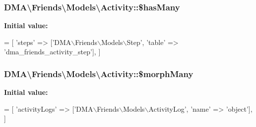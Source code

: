 \subsubsection[{\$has\+Many}]{\setlength{\rightskip}{0pt plus 5cm}D\+M\+A\textbackslash{}\+Friends\textbackslash{}\+Models\textbackslash{}\+Activity\+::\$has\+Many}\label{classDMA_1_1Friends_1_1Models_1_1Activity_a8b255e9889df95f8c702b72ed49ace25}
{\bfseries Initial value\+:}
\begin{DoxyCode}
= [
        \textcolor{stringliteral}{'steps'} => [\textcolor{stringliteral}{'DMA\(\backslash\)Friends\(\backslash\)Models\(\backslash\)Step'}, \textcolor{stringliteral}{'table'} => \textcolor{stringliteral}{'dma\_friends\_activity\_step'}],
    ]
\end{DoxyCode}
\hypertarget{classDMA_1_1Friends_1_1Models_1_1Activity_a192fdaacf609961b7a436d2b967dfd60}{}
\subsubsection[{\$morph\+Many}]{\setlength{\rightskip}{0pt plus 5cm}D\+M\+A\textbackslash{}\+Friends\textbackslash{}\+Models\textbackslash{}\+Activity\+::\$morph\+Many}\label{classDMA_1_1Friends_1_1Models_1_1Activity_a192fdaacf609961b7a436d2b967dfd60}
{\bfseries Initial value\+:}
\begin{DoxyCode}
= [ 
        \textcolor{stringliteral}{'activityLogs'}  => [\textcolor{stringliteral}{'DMA\(\backslash\)Friends\(\backslash\)Models\(\backslash\)ActivityLog'}, \textcolor{stringliteral}{'name'} => \textcolor{stringliteral}{'object'}],
    ]
\end{DoxyCode}
\hypertarget{classDMA_1_1Friends_1_1Models_1_1Activity_a5cfb1d646716be755dcdb6ddb3ab16b1}{}
